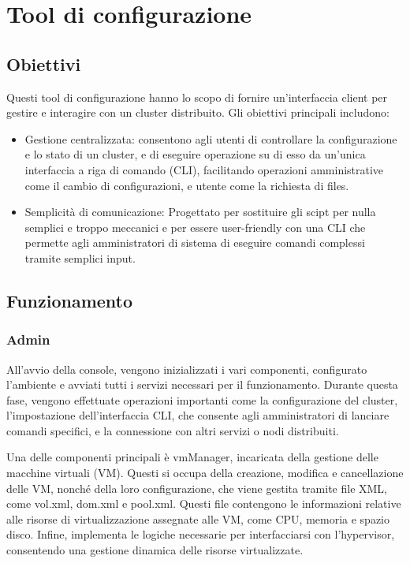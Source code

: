 \section{Tool di configurazione}
\subsection{Obiettivi}
Questi tool di configurazione hanno lo scopo di fornire un'interfaccia client per gestire e interagire con un cluster distribuito. Gli obiettivi principali includono:
\begin{itemize}
  \item Gestione centralizzata: consentono agli utenti di controllare la configurazione e lo stato di un cluster, e di eseguire operazione su di esso da un'unica interfaccia a riga di comando (CLI), facilitando operazioni 
  amministrative come il cambio di configurazioni, e utente come la richiesta di files.
  \item Semplicità di comunicazione: Progettato per sostituire gli scipt per nulla semplici e troppo meccanici e per essere user-friendly con una CLI che permette agli amministratori di sistema di eseguire comandi 
  complessi tramite semplici input.
\end{itemize}


\subsection{Funzionamento}
\subsubsection{Admin}
All'avvio della console, vengono inizializzati i vari componenti, configurato l'ambiente e avviati tutti i servizi 
necessari per il funzionamento. Durante questa fase, vengono effettuate operazioni importanti come la configurazione del cluster, l'impostazione dell'interfaccia CLI, che consente agli amministratori di lanciare comandi 
specifici, e la connessione con altri servizi o nodi distribuiti.

Una delle componenti principali è vmManager, incaricata della gestione delle macchine virtuali (VM). Questi si occupa della creazione, modifica e 
cancellazione delle VM, nonché della loro configurazione, che viene gestita tramite file XML, come vol.xml, dom.xml e pool.xml. Questi file contengono le informazioni relative alle risorse di virtualizzazione assegnate alle 
VM, come CPU, memoria e spazio disco. Infine, implementa le logiche necessarie per interfacciarsi con l'hypervisor, consentendo una gestione dinamica delle risorse virtualizzate.


